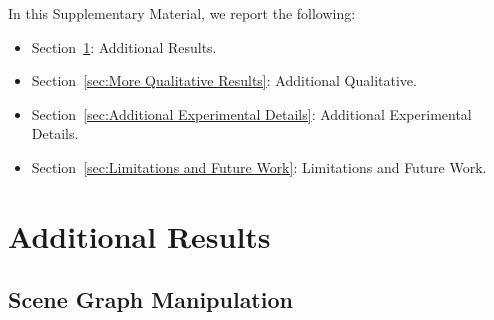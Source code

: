 \appendix

\renewcommand{\thetable}{\arabic{table}}
\renewcommand{\thefigure}{\arabic{figure}}
\renewcommand{\thesection}{A\arabic{section}}
\renewcommand{\theequation}{\arabic{equation}}

\setcounter{table}{0}
\setcounter{section}{0}
\setcounter{equation}{0}
\setcounter{figure}{0}


In this Supplementary Material, we report the following:
\begin{itemize}
\item Section~\ref{sec:Additional Results}: Additional Results.
\item Section~\ref{sec:More Qualitative Results}: Additional Qualitative.
\item Section~\ref{sec:Additional Experimental Details}: Additional Experimental Details.
\item Section~\ref{sec:Limitations and Future Work}: Limitations and Future Work.
\end{itemize}

\section{Additional Results}
\label{sec:Additional Results}



\subsection{Scene Graph Manipulation}

